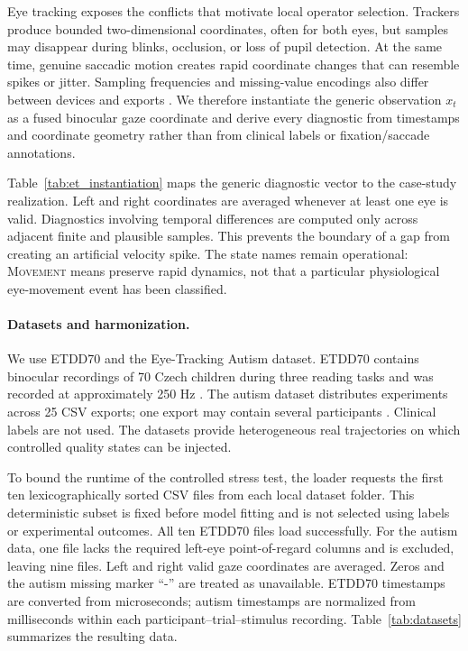 \documentclass[sigconf,review]{acmart}
\begin{document}
Eye tracking exposes the conflicts that motivate local operator selection. Trackers produce bounded two-dimensional coordinates, often for both eyes, but samples may disappear during blinks, occlusion, or loss of pupil detection. At the same time, genuine saccadic motion creates rapid coordinate changes that can resemble spikes or jitter. Sampling frequencies and missing-value encodings also differ between devices and exports \cite{holmqvist2011eye,hessels2017noise,dar2021remodnav}. We therefore instantiate the generic observation $x_t$ as a fused binocular gaze coordinate and derive every diagnostic from timestamps and coordinate geometry rather than from clinical labels or fixation/saccade annotations.

Table~\ref{tab:et_instantiation} maps the generic diagnostic vector to the case-study realization. Left and right coordinates are averaged whenever at least one eye is valid. Diagnostics involving temporal differences are computed only across adjacent finite and plausible samples. This prevents the boundary of a gap from creating an artificial velocity spike. The state names remain operational: \textsc{Movement} means preserve rapid dynamics, not that a particular physiological eye-movement event has been classified.
\paragraph{Datasets and harmonization.}

We use ETDD70 and the Eye-Tracking Autism dataset. ETDD70 contains binocular recordings of 70 Czech children during three reading tasks and was recorded at approximately 250 Hz \cite{sedmidubsky2025etdd70}. The autism dataset distributes experiments across 25 CSV exports; one export may contain several participants \cite{cilia2022autism}. Clinical labels are not used. The datasets provide heterogeneous real trajectories on which controlled quality states can be injected.

To bound the runtime of the controlled stress test, the loader requests the first ten lexicographically sorted CSV files from each local dataset folder. This deterministic subset is fixed before model fitting and is not selected using labels or experimental outcomes. All ten ETDD70 files load successfully. For the autism data, one file lacks the required left-eye point-of-regard columns and is excluded, leaving nine files. Left and right valid gaze coordinates are averaged. Zeros and the autism missing marker ``-'' are treated as unavailable. ETDD70 timestamps are converted from microseconds; autism timestamps are normalized from milliseconds within each participant--trial--stimulus recording. Table~\ref{tab:datasets} summarizes the resulting data.
\end{document}
